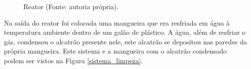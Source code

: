 \begin{figure}[!htb]
	\centering
	\quad %
	\caption{Reator (Fonte: autoria própria).}
	\label{foto_reator}
\end{figure}

Na saída do reator foi colocada uma mangueira que era resfriada em água à temperatura ambiente dentro de um galão de plástico. A água, além de resfriar o gás, condensou o alcatrão presente nele, este alcatrão se depositou nas paredes da própria mangueira. Este sistema e a mangueira com o alcatrão condensado podem ser vistos na Figura \ref{sistema_limpeza}.

